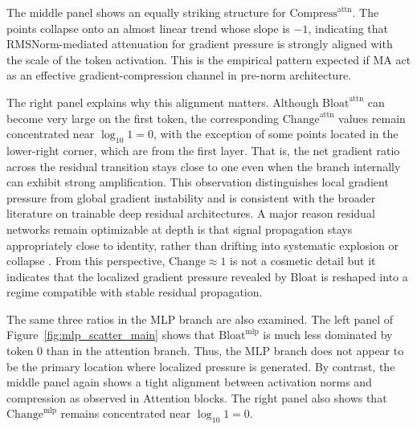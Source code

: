 \documentclass{article}
\theoremstyle{plain}
\theoremstyle{definition}
\theoremstyle{remark}
\begin{document}
The middle panel shows an equally striking structure for $\mathrm{Compress}^{\mathrm{attn}}$.
The points collapse onto an almost linear trend whose slope is $-1$, indicating that RMSNorm-mediated attenuation for gradient pressure is strongly aligned with the scale of the token activation.
This is the empirical pattern expected if MA act as an effective gradient-compression channel in pre-norm architecture.

The right panel explains why this alignment matters.
Although $\mathrm{Bloat}^{\mathrm{attn}}$ can become very large on the first token, the corresponding $\mathrm{Change}^{\mathrm{attn}}$ values remain concentrated near $\log_{10}1 = 0$, with the exception of some points located in the lower-right corner, which are from the first layer.
That is, the net gradient ratio across the residual transition stays close to one even when the branch internally can exhibit strong amplification.
This observation distinguishes local gradient pressure from global gradient instability and is consistent with the broader literature on trainable deep residual architectures.
A major reason residual networks remain optimizable at depth is that signal propagation stays appropriately close to identity, rather than drifting into systematic explosion or collapse \citep{he2016deep,zhang2019fixup,liu2020understanding,bachlechner2021rezero,wang2024deepnet}.
From this perspective, $\mathrm{Change}\approx 1$ is not a cosmetic detail but it indicates that the localized gradient pressure revealed by $\mathrm{Bloat}$ is reshaped into a regime compatible with stable residual propagation.

The same three ratios in the MLP branch are also examined.
The left panel of Figure~\ref{fig:mlp_scatter_main} shows that $\mathrm{Bloat}^{\mathrm{mlp}}$ is much less dominated by token 0 than in the attention branch.
Thus, the MLP branch does not appear to be the primary location where localized pressure is generated.
By contrast, the middle panel again shows a tight alignment between activation norms and compression as observed in Attention blocks. The right panel also shows that $\mathrm{Change}^{\mathrm{mlp}}$ remains concentrated near $\log_{10}1=0$.
\end{document}
